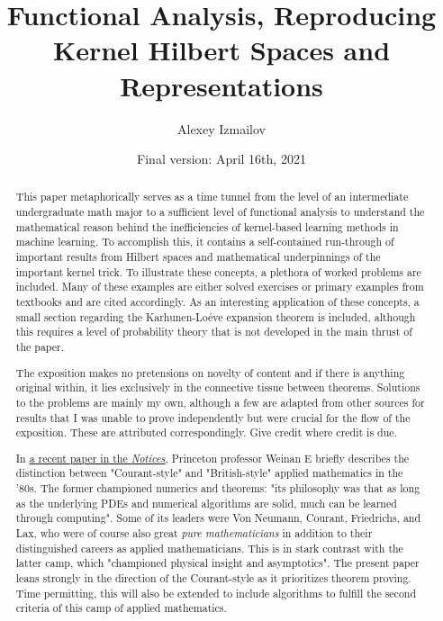 \documentclass[psamsfonts]{amsart}
\title{Functional Analysis, Reproducing Kernel Hilbert Spaces and Representations}
\author{Alexey Izmailov}
\date{Final version: April 16th, 2021}
\theoremstyle{definition}
\theoremstyle{remark}
\numberwithin{equation}{section}
\begin{document}
\begin{abstract}
This paper metaphorically serves as a time tunnel from the level of an intermediate undergraduate math major to a sufficient level of functional analysis to understand the mathematical reason behind the inefficiencies of kernel-based learning methods in machine learning. To accomplish this, it contains a self-contained run-through of important results from Hilbert spaces and mathematical underpinnings of the important kernel trick. To illustrate these concepts, a plethora of worked problems are included. Many of these examples are either solved exercises or primary examples from textbooks and are cited accordingly. As an interesting application of these concepts, a small section regarding the Karhunen-Lo\'{e}ve expansion theorem is included, although this requires a level of probability theory that is not developed in the main thrust of the paper. 

The exposition makes no pretensions on novelty of content and if there is anything original within, it lies exclusively in the connective tissue between theorems. Solutions to the problems are mainly my own, although a few are adapted from other sources for results that I was unable to prove independently but were crucial for the flow of the exposition. These are attributed correspondingly. Give credit where credit is due. 

In \href{https://www.ams.org/journals/notices/202104/rnoti-p565.pdf}{a recent paper in the \textit{Notices}}, Princeton professor Weinan E briefly describes the distinction between "Courant-style" and "British-style" applied mathematics in the '80s. The former championed numerics and theorems: "its philosophy was that as long as the underlying PDEs and numerical algorithms are solid, much can be learned through computing". Some of its leaders were Von Neumann, Courant, Friedrichs, and Lax, who were of course also great \textit{pure mathematicians} in addition to their distinguished careers as applied mathematicians. This is in stark contrast with the latter camp, which "championed physical insight and asymptotics". The present paper leans strongly in the direction of the Courant-style as it prioritizes theorem proving. Time permitting, this will also be extended to include algorithms to fulfill the second criteria of this camp of applied mathematics. 
\end{abstract}



\maketitle
\pagebreak
\tableofcontents
\pagebreak
\end{document}

